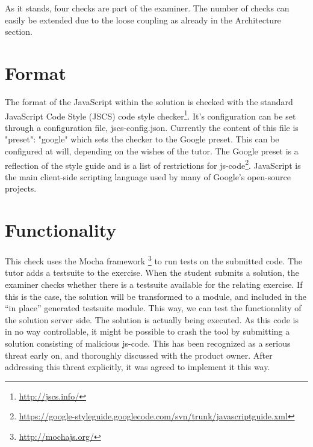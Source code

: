 % 

As it stands, four checks are part of the \gls{examiner}.
The number of checks can easily be extended due to the loose coupling as already
in the Architecture section.

\section{Format}

The format of the JavaScript within the solution is checked with the standard
JavaScript Code Style (JSCS) code style checker\footnote{\url{http://jscs.info/}}.
It's configuration can be set through a configuration file, jscs-config.json.
Currently the content of this file is {"preset": "google"} which sets the checker
to the Google preset.
This can be configured at will, depending on the wishes of the tutor.
The Google preset is a reflection of the style guide and is a list of restrictions
for \gls{js-code}\footnote{\url{https://google-styleguide.googlecode.com/svn/trunk/javascriptguide.xml}}.
JavaScript is the main client-side scripting language used by many of Google's
open-source projects.


\section{Functionality}

This \gls{check} uses the Mocha framework \footnote{\url{http://mochajs.org/}} 
to run tests on the submitted code. The \gls{tutor} adds a testsuite to the
exercise. When the \gls{student} submits a \gls{solution}, the \gls{examiner}
checks whether there is a testsuite available for the relating \gls{exercise}.
If this is the case, the \gls{solution} will be transformed to a module, and
included in the ``in place'' generated testsuite module. This way, we can test
the functionality of the \gls{solution} server side. The \gls{solution} is
actually being executed. As this code is in no way controllable, it might be
possible to crash the tool by submitting a \gls{solution} consisting of 
malicious \gls{js-code}. This has been recognized as a serious threat early on,
and thoroughly discussed with the product owner. After addressing this threat 
explicitly, it was agreed to implement it this way.

